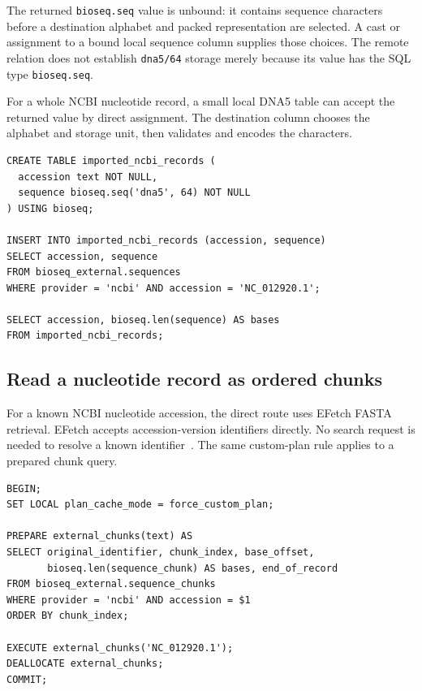 The returned \texttt{bioseq.seq} value is unbound: it contains sequence
characters before a destination alphabet and packed representation are
selected. A cast or assignment to a bound local sequence column supplies
those choices. The remote relation does not establish \texttt{dna5/64}
storage merely because its value has the SQL type \texttt{bioseq.seq}.

For a whole NCBI nucleotide record, a small local DNA5 table can accept the
returned value by direct assignment. The destination column chooses the
alphabet and storage unit, then validates and encodes the characters.

\par\noindent\begin{minipage}{\linewidth}
\begin{lstlisting}[style=bioseq-appendix-sql]
CREATE TABLE imported_ncbi_records (
  accession text NOT NULL,
  sequence bioseq.seq('dna5', 64) NOT NULL
) USING bioseq;

INSERT INTO imported_ncbi_records (accession, sequence)
SELECT accession, sequence
FROM bioseq_external.sequences
WHERE provider = 'ncbi' AND accession = 'NC_012920.1';

SELECT accession, bioseq.len(sequence) AS bases
FROM imported_ncbi_records;
\end{lstlisting}
\end{minipage}

\subsection{Read a nucleotide record as ordered chunks}
\label{app-remote-chunks}

For a known NCBI nucleotide accession, the direct route uses EFetch FASTA
retrieval. EFetch accepts accession-version identifiers directly. No search
request is needed to resolve a known identifier~\autocite{ncbiEutilities}.
The same custom-plan rule applies to a prepared chunk query.

\par\noindent\begin{minipage}{\linewidth}
\begin{lstlisting}[style=bioseq-appendix-sql]
BEGIN;
SET LOCAL plan_cache_mode = force_custom_plan;

PREPARE external_chunks(text) AS
SELECT original_identifier, chunk_index, base_offset,
       bioseq.len(sequence_chunk) AS bases, end_of_record
FROM bioseq_external.sequence_chunks
WHERE provider = 'ncbi' AND accession = $1
ORDER BY chunk_index;

EXECUTE external_chunks('NC_012920.1');
DEALLOCATE external_chunks;
COMMIT;
\end{lstlisting}
\end{minipage}


